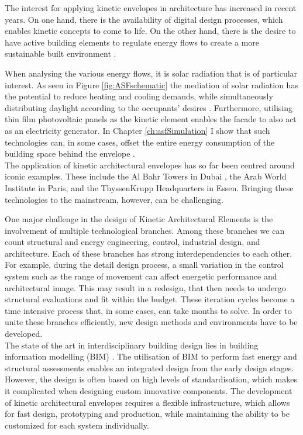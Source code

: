 
The interest for applying kinetic envelopes in architecture has increased in recent years. On one hand, there is the availability of digital design processes, which enables kinetic concepts to come to life. On the other hand, there is the desire to have active building elements to regulate energy flows to create a more sustainable built environment \cite{loonen2013climate}. 

When analysing the various energy flows, it is solar radiation that is of particular interest. As seen in Figure \ref{fig:ASFschematic} the mediation of solar radiation has the potential to reduce heating and cooling demands, while simultaneously distributing daylight according to the occupants' desires \cite{nagy2016adaptive}. Furthermore, utilising thin film photovoltaic panels as the kinetic element enables the facade to also act as an electricity generator. In Chapter \ref{ch:asfSimulation} I show that such technologies can, in some cases, offset the entire energy consumption of the building space behind the envelope \cite{jayathissa2017optimising}. \\

The application of kinetic architectural envelopes has so far been centred around iconic examples. These include the Al Bahr Towers in Dubai \cite{oborn2012bahr}, the Arab World Institute in Paris, and the ThyssenKrupp Headquarters in Essen. Bringing these technologies to the mainstream, however, can be challenging. 

One major challenge in the design of Kinetic Architectural Elements is the involvement of multiple technological branches. Among these branches we can count structural and energy engineering, control, industrial design, and architecture. Each of these branches has strong interdependencies to each other. For example, during the detail design process, a small variation in the control system such as the range of movement can affect energetic performance and architectural image. This may result in a redesign, that then needs to undergo structural evaluations and fit within the budget. These iteration cycles become a time intensive process that, in some cases, can take months to solve. In order to unite these branches efficiently, new design methods and environments have to be developed. \\

The state of the art in interdisciplinary building design lies in building information modelling (BIM) \cite{schlueter2009building, volk2014building}. The utilisation of BIM to perform fast energy and structural assessments enables an integrated design from the early design stages. However, the design is often based on high levels of standardisation, which makes it complicated when designing custom innovative components. The development of kinetic architectural envelopes requires a flexible infrastructure, which allows for fast design, prototyping and production, while maintaining the ability to be customized for each system individually. 

